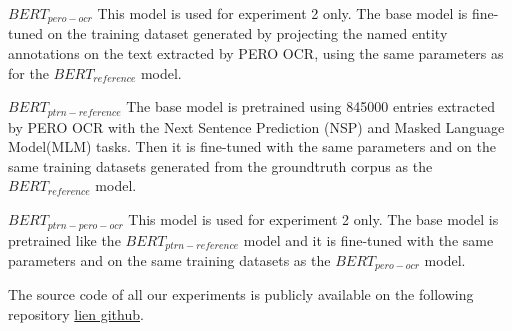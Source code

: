 $BERT_{pero-ocr}$ This model is used for experiment 2 only. The base model is fine-tuned on the training dataset generated by projecting the named entity annotations on the text extracted by PERO OCR, using the same parameters as for the $BERT_{reference}$ model.

$BERT_{ptrn-reference}$ The base model is pretrained using 845000 entries extracted by PERO OCR with the Next  Sentence  Prediction  (NSP) and  Masked  Language  Model(MLM) tasks. Then it is fine-tuned with the same parameters and on the same training datasets generated from the groundtruth corpus as the $BERT_{reference}$ model.

$BERT_{ptrn-pero-ocr}$ This model is used for experiment 2 only. The base model is pretrained like the $BERT_{ptrn-reference}$ model and it is fine-tuned with the same parameters and on the same training datasets as the $BERT_{pero-ocr}$ model.

The source code of all our experiments is publicly available on the following repository \url{lien github}.